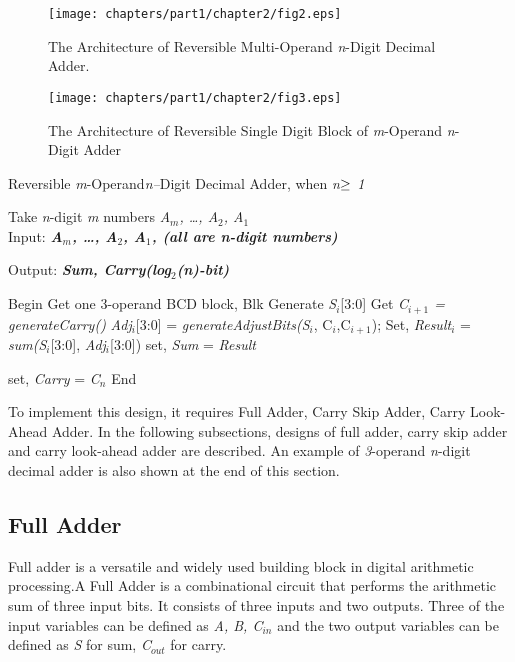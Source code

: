 \begin{figure}[!tbh]
	\centering
	\texttt{[image: chapters/part1/chapter2/fig2.eps]}
	\caption{The Architecture of Reversible Multi-Operand {\it n}-Digit Decimal Adder.}
	\label{fig:p1_c2_fig2}
\end{figure}

\begin{figure}[!tbh]
	\centering
	\texttt{[image: chapters/part1/chapter2/fig3.eps]}
	\caption{The Architecture of Reversible Single Digit Block of {\it m}-Operand {\it n}-Digit Adder}
	\label{fig:p1_c2_fig3}
\end{figure}

\begin{algorithm}[!h]
	\caption{Reversible {\it m}-Operand{\it n--}Digit Decimal Adder, when {\it n$\bold{\ge}$ 1}}
	Take \textit{n}-digit \textit{m} numbers {\it A${}_{m}$, {\dots}, A${}_{2}$, A${}_{1}$}
	\label{alg:part1_c2_alg1}
	\\Input: {\bf {\it A${}_{m}$, {\dots}, A${}_{2}$, A${}_{1}$, (all are n-digit numbers)}}
	
	{\bf {\it  }}Output: {\bf {\it Sum, Carry(log${}_{2}$(n)-bit)}}
	\begin{algorithmic}[1]
		
		\STATE Begin
		\STATE Get one 3-operand BCD block, Blk
		\STATE Generate \textit{S}${}_{i}$[3:0]
		\STATE Get\textit{ C${}_{i+1}$ = generateCarry()}
		\STATE \textit{Adj}${}_{i}$[3:0] = \textit{generateAdjustBits(S${}_{i}$}, C${}_{i}$,C${}_{i+1}$);        
		\STATE Set, \textit{Result}${}_{i}$ = \textit{sum(S}${}_{i}$[3:0], \textit{Adj}${}_{i}$[3:0]) 
		\ENDFOR
		\STATE set, {\it Sum} =\textit{ Result}
		
		\STATE set, {\it Carry} = \textit{C}${}_{n}${\bf }
		\STATE End
	\end{algorithmic}
\end{algorithm}

To implement this design, it requires Full Adder, Carry Skip Adder, Carry Look-Ahead Adder. In the following subsections, designs of full adder, carry skip adder and carry look-ahead adder are described. An example of {\it 3}-operand {\it n}-digit decimal adder is also shown at the end of this section.

\subsection{Full Adder}
Full adder is a versatile and widely used building block in digital arithmetic processing.A Full Adder is a combinational circuit that performs the arithmetic sum of three input bits. It consists of three inputs and two outputs. Three of the input variables can be defined as {\it A, B, C${}_{in}$} and the two output variables can be defined as {\it S} for sum, {\it C${}_{out}$} for carry.

